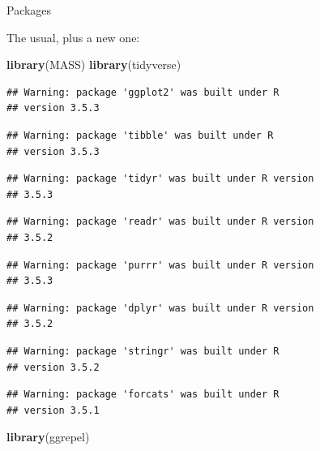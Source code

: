 \documentclass[ignorenonframetext,]{beamer}
\newenvironment{Shaded}{\begin{snugshade}}{\end{snugshade}}
\newcommand{\KeywordTok}[1]{\textcolor[rgb]{0.13,0.29,0.53}{\textbf{#1}}}
\newcommand{\NormalTok}[1]{#1}
\begin{document}
\begin{frame}[fragile]{Packages}
\protect\hypertarget{packages-8}{}

The usual, plus a new one:

\begin{Shaded}
\begin{Highlighting}[]
\KeywordTok{library}\NormalTok{(MASS)}
\KeywordTok{library}\NormalTok{(tidyverse)}
\end{Highlighting}
\end{Shaded}

\begin{verbatim}
## Warning: package 'ggplot2' was built under R
## version 3.5.3
\end{verbatim}

\begin{verbatim}
## Warning: package 'tibble' was built under R
## version 3.5.3
\end{verbatim}

\begin{verbatim}
## Warning: package 'tidyr' was built under R version
## 3.5.3
\end{verbatim}

\begin{verbatim}
## Warning: package 'readr' was built under R version
## 3.5.2
\end{verbatim}

\begin{verbatim}
## Warning: package 'purrr' was built under R version
## 3.5.3
\end{verbatim}

\begin{verbatim}
## Warning: package 'dplyr' was built under R version
## 3.5.2
\end{verbatim}

\begin{verbatim}
## Warning: package 'stringr' was built under R
## version 3.5.2
\end{verbatim}

\begin{verbatim}
## Warning: package 'forcats' was built under R
## version 3.5.1
\end{verbatim}

\begin{Shaded}
\begin{Highlighting}[]
\KeywordTok{library}\NormalTok{(ggrepel)}
\end{Highlighting}
\end{Shaded}


\end{frame}
\end{document}
